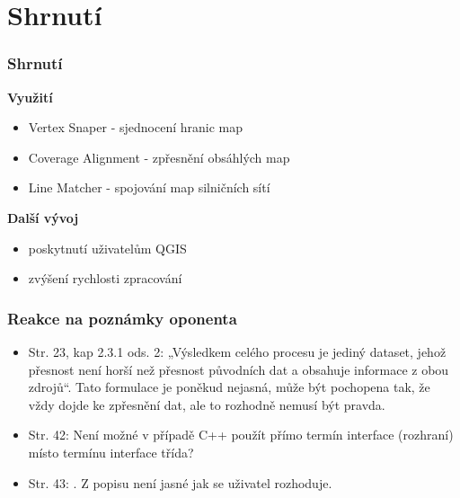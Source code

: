 \documentclass[unicode,bookmarksnumbered]{beamer}
\begin{document}
\section{Shrnutí} %
  \begin{frame}
  \frametitle{Shrnutí}
   \textbf{Využití}
     \begin{itemize}
      \item Vertex Snaper - 
	  sjednocení hranic map
      \item Coverage Alignment - 
	  zpřesnění obsáhlých map %
      \item Line Matcher - 
	  spojování map silničních sítí%
     \end{itemize}
   \textbf{Další vývoj}
     \begin{itemize}
      \item poskytnutí uživatelům QGIS
      \item zvýšení rychlosti zpracování%
     \end{itemize}
  \end{frame}
 

 \begin{frame}
  \frametitle{Reakce na poznámky oponenta}
\small
     \begin{itemize}
       \item Str. 23, kap 2.3.1 ods. 2: „Výsledkem celého procesu je jediný dataset, jehož 
přesnost není horší než přesnost původních dat a obsahuje informace z obou 
zdrojů“. Tato formulace je poněkud nejasná, může být pochopena tak, že vždy 
dojde ke zpřesnění dat, ale to rozhodně nemusí být pravda. %
      \pause[] 
      \item Str. 42: Není možné v případě C++ použít přímo termín interface (rozhraní) místo 
termínu interface třída? %
      \pause[]  
      \item Str. 43: . Z popisu není jasné 
jak se uživatel rozhoduje. %
     \end{itemize}
 \end{frame}
\end{document}
